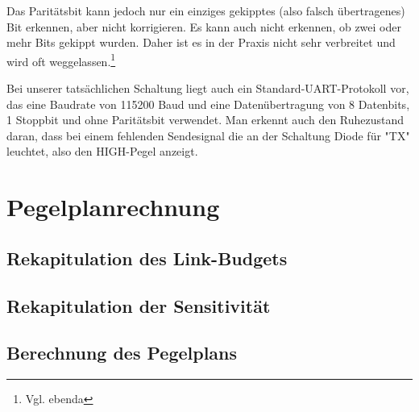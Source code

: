 Das Paritätsbit kann jedoch nur ein einziges gekipptes (also falsch übertragenes) Bit erkennen, aber nicht korrigieren. Es kann auch nicht erkennen, ob zwei oder mehr Bits gekippt wurden. Daher ist es in der Praxis nicht sehr verbreitet und wird oft weggelassen.\footnote{Vgl. ebenda}

Bei unserer tatsächlichen Schaltung liegt auch ein Standard-UART-Protokoll vor, das eine Baudrate von 115200 Baud und eine Datenübertragung von 8 Datenbits, 1 Stoppbit und ohne Paritätsbit verwendet. Man erkennt auch den Ruhezustand daran, dass bei einem fehlenden Sendesignal die an der Schaltung Diode für "TX" leuchtet, also den HIGH-Pegel anzeigt.

\section{Pegelplanrechnung}
\subsection{Rekapitulation des Link-Budgets}
\subsection{Rekapitulation der Sensitivität}
\subsection{Berechnung des Pegelplans}